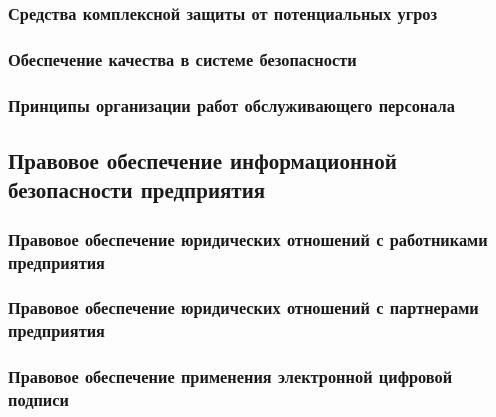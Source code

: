 \subsubsection{Средства комплексной защиты от потенциальных угроз}
\label{subsubsec:measures:techical:comprehensive}

\subsubsection{Обеспечение качества в системе безопасности}
\label{subsubsec:measures:techical:qa}

\subsubsection{Принципы организации работ обслуживающего персонала}
\label{subsubsec:measures:technical:service_staff}


\subsection{Правовое обеспечение информационной безопасности предприятия}
\label{subsec:measures:law}

\subsubsection{Правовое обеспечение юридических отношений с работниками предприятия}
\label{subsubsec:measures:law:employees}

\subsubsection{Правовое обеспечение юридических отношений с партнерами предприятия}
\label{subsubsec:measures:law:partners}

\subsubsection{Правовое обеспечение применения электронной цифровой подписи}
\label{subsubsec:measures:law:digital_signature}

